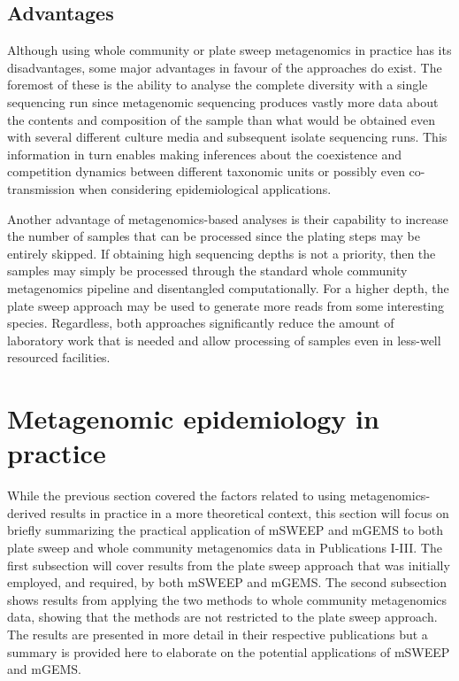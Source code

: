 \documentclass[officiallayout]{tktla}
\begin{document}
\subsection{Advantages}

Although using whole community or plate sweep metagenomics in practice has its
disadvantages, some major advantages in favour of the approaches do
exist. The foremost of these is the ability to analyse the complete
diversity with a single sequencing run since metagenomic
sequencing produces vastly more data about the contents and composition
of the sample than what would be obtained even with several different
culture media and subsequent isolate sequencing runs. This information
in turn enables making inferences about the coexistence and
competition dynamics between different taxonomic units or possibly
even co-transmission when considering epidemiological applications.

Another advantage of metagenomics-based analyses is their capability
to increase the number of samples that can be processed since the
plating steps may be entirely skipped. If obtaining high sequencing depths is not a priority, then the samples may simply be
processed through the standard whole community metagenomics pipeline and disentangled
computationally. For a higher depth, the plate sweep approach may be
used to generate more reads from some interesting species. Regardless,
both approaches significantly reduce the amount of laboratory work
that is needed and allow processing of samples even in less-well
resourced facilities.

\section{Metagenomic epidemiology in practice}

While the previous section covered the factors related to using
metagenomics-derived results in practice in a more theoretical
context, this section will focus on briefly summarizing the practical
application of mSWEEP and mGEMS to both plate sweep and whole community
metagenomics data in Publications I-III. The first subsection will
cover results from the plate sweep approach that was initially
employed, and required, by both mSWEEP and mGEMS. The second
subsection shows results from applying the two methods to whole community
metagenomics data, showing that the methods are not restricted to the
plate sweep approach. The results are presented in more detail in
their respective publications but a summary is provided here to elaborate on
the potential applications of mSWEEP and mGEMS.
\end{document}
